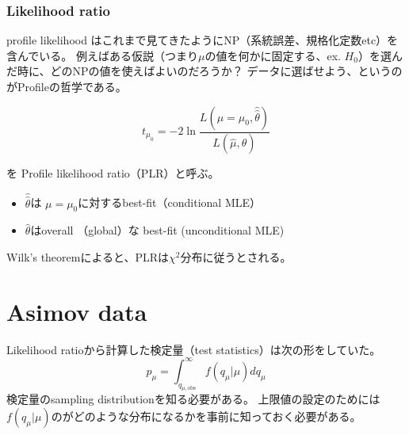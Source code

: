 \subsection{Likelihood ratio}
profile likelihood はこれまで見てきたようにNP（系統誤差、規格化定数etc）を含んでいる。
例えばある仮説（つまり$\mu$の値を何かに固定する、ex. $H_0$）を選んだ時に、どのNPの値を使えばよいのだろうか？
データに選ばせよう、というのがProfileの哲学である。

\begin{equation}
t_{\mu_0} =  -2 \ln\frac{L(\mu=\mu_0,\hat{\hat{\theta}})}{L(\hat{\mu},\hat{\theta})}
\end{equation}

を Profile likelihood ratio（PLR）と呼ぶ。

\begin{itemize}
  \item $\hat{\hat{\theta}}$は $\mu=\mu_0$に対するbest-fit（conditional MLE）
  \item $\hat{\theta}$はoverall （global）な best-fit (unconditional MLE)
\end{itemize}

Wilk's theoremによると、PLRは$\chi^2$分布に従うとされる。


\chapter{Asimov data}

Likelihood ratioから計算した検定量（test statistics）は次の形をしていた。
\begin{equation}
  p_\mu = \int_{q_{\mu,\mathrm{obs}}}^\infty f(q_\mu|\mu)dq_\mu
\end{equation}
検定量のsampling distributionを知る必要がある。
上限値の設定のためには$f(q_\mu|\mu)$のがどのような分布になるかを事前に知っておく必要がある。
